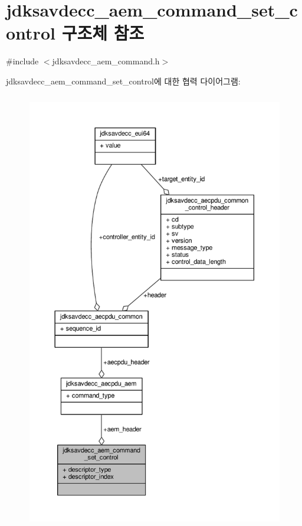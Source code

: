 \hypertarget{structjdksavdecc__aem__command__set__control}{}\section{jdksavdecc\+\_\+aem\+\_\+command\+\_\+set\+\_\+control 구조체 참조}
\label{structjdksavdecc__aem__command__set__control}


{\ttfamily \#include $<$jdksavdecc\+\_\+aem\+\_\+command.\+h$>$}



jdksavdecc\+\_\+aem\+\_\+command\+\_\+set\+\_\+control에 대한 협력 다이어그램\+:
\nopagebreak
\begin{figure}[H]
\begin{center}
\leavevmode
\includegraphics[height=550pt]{structjdksavdecc__aem__command__set__control__coll__graph}
\end{center}
\end{figure}

